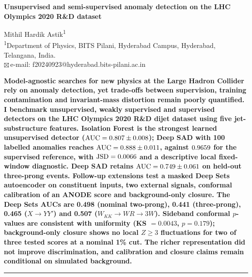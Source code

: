 \documentclass[11pt,a4paper]{article}
\newcommand{\auc}{\mathrm{AUC}}
\newcommand{\jsd}{\mathrm{JSD}}
\begin{document}
\begin{flushleft}
{\sffamily\bfseries\fontsize{20}{24}\selectfont
Unsupervised and semi-supervised anomaly detection on the LHC Olympics 2020 R\&D dataset\par}
\vspace{12pt}
{\sffamily\large Mithil Hardik Astik\textsuperscript{1}}\\[6pt]
{\small\textsuperscript{1}Department of Physics, BITS Pilani, Hyderabad Campus, Hyderabad, Telangana, India.\\
\hspace*{0.5em}$\boxtimes$\,e-mail: f20240923@hyderabad.bits-pilani.ac.in}
\end{flushleft}

\begin{flushleft}
\sffamily\small
\textbf{Model-agnostic searches for new physics at the Large Hadron Collider rely on anomaly
detection, yet trade-offs between supervision, training contamination and invariant-mass
distortion remain poorly quantified. I benchmark unsupervised, weakly supervised and
supervised detectors on the LHC Olympics 2020 R\&D dijet dataset using five jet-substructure
features. Isolation Forest is the strongest learned unsupervised detector ($\auc = \IFHeadline$);
Deep SAD with 100 labelled anomalies reaches $\auc = \SADHeadline$, against $0.9659$ for
the supervised reference, with $\jsd = \SADJSD$ and a descriptive local fixed-window diagnostic. Deep SAD retains $\auc = \SADTransferHeadline$ on held-out
three-prong events. Follow-up extensions test a masked Deep Sets autoencoder on constituent
inputs, two external signals, conformal calibration of an ANODE score and background-only
closure. The Deep Sets AUCs are 0.498 (nominal two-prong), 0.441 (three-prong), 0.465
($X\to YY'$) and 0.507 ($W_{KK}\to WR\to3W$). Sideband conformal $p$-values are consistent with uniformity (KS $= 0.0043$,
$p = 0.179$); background-only closure shows no local $Z \geq 3$ fluctuations for two of
three tested scores at a nominal 1\% cut. The richer representation did not improve
discrimination, and calibration and closure claims remain conditional on simulated
background.}
\end{flushleft}

\vspace{4pt}
\hrule
\vspace{2pt}

\end{document}
